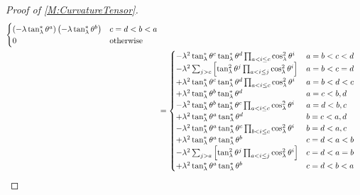 \documentclass[../methodology.tex]{subfiles}
\begin{document}
\begin{proof}[Proof of \cref{M:CurvatureTensor}]
\begin{align*}
\begin{cases}
          \left(
          -\lambda\tan_\lambda^\ast\tensor{\theta}{^a}
          \right)
          \left(
          -\lambda\tan_\lambda^\ast\tensor{\theta}{^b}
          \right)
            & \text{\(c=d<b<a\)} \\
          0 & \text{otherwise}   \\
        \end{cases}                                                                                        \\
     & =\begin{cases}
          -\lambda^2\tan_\lambda^\ast\tensor{\theta}{^c}\tan_\lambda^\ast\tensor{\theta}{^d}\prod_{a<i\le c}\cos_\lambda^2\tensor{\theta}{^i}
            & \text{\(a=b<c<d\)} \\
          -\lambda^2
          \sum_{j>c}
          \left[
            \tan_\lambda^2\tensor{\theta}{^j}\prod_{a<i\le j}\cos_\lambda^2\tensor{\theta}{^i}
            \right]
            & \text{\(a=b<c=d\)} \\
          +\lambda^2\tan_\lambda^\ast\tensor{\theta}{^c}\tan_\lambda^\ast\tensor{\theta}{^d}\prod_{a<i\le c}\cos_\lambda^2\tensor{\theta}{^i}
            & \text{\(a=b<d<c\)} \\
          +\lambda^2\tan_\lambda^\ast\tensor{\theta}{^b}\tan_\lambda^\ast\tensor{\theta}{^d}
            & \text{\(a=c<b,d\)} \\
          -\lambda^2\tan_\lambda^\ast\tensor{\theta}{^b}\tan_\lambda^\ast\tensor{\theta}{^c}\prod_{a<i\le c}\cos_\lambda^2\tensor{\theta}{^i}
            & \text{\(a=d<b,c\)} \\
          +\lambda^2\tan_\lambda^\ast\tensor{\theta}{^a}\tan_\lambda^\ast\tensor{\theta}{^d}
            & \text{\(b=c<a,d\)} \\
          -\lambda^2\tan_\lambda^\ast\tensor{\theta}{^a}\tan_\lambda^\ast\tensor{\theta}{^c}\prod_{b<i\le c}\cos_\lambda^2\tensor{\theta}{^i}
            & \text{\(b=d<a,c\)} \\
          +\lambda^2\tan_\lambda^\ast\tensor{\theta}{^a}\tan_\lambda^\ast\tensor{\theta}{^b}
            & \text{\(c=d<a<b\)} \\
          -\lambda^2
          \sum_{j>a}
          \left[
            \tan_\lambda^2\tensor{\theta}{^j}\prod_{a<i\le j}\cos_\lambda^2\tensor{\theta}{^i}
            \right]
            & \text{\(c=d<a=b\)} \\
          +\lambda^2\tan_\lambda^\ast\tensor{\theta}{^a}\tan_\lambda^\ast\tensor{\theta}{^b}
            & \text{\(c=d<b<a\)} \\

\end{cases}
\end{align*}
\end{proof}
\end{document}
